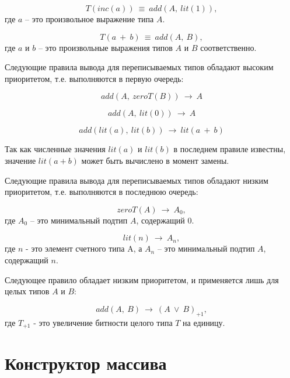 \documentclass[10pt,a4paper]{article}
\begin{document}
\begin{equation}
T(inc(a))~\equiv~add(A,~lit(1)),
\end{equation}
где $ a $ -- это произвольное выражение типа $ A $.

\begin{equation}
T(a~+~b)~\equiv~add(A,~B),
\end{equation}
где $ a $ и $ b $ -- это произвольные выражения типов $ A $ и $ B $ соответственно.

Следующие правила вывода для переписываемых типов обладают высоким приоритетом, т.е. выполняются в первую
очередь:

\begin{equation}
add(A,~zeroT(B))~\rightarrow~A
\end{equation}

\begin{equation}
add(A,~lit(0))~\rightarrow~A
\end{equation}

\begin{equation}
add(lit(a),~lit(b))~\rightarrow~lit(a~+~b)
\end{equation}

Так как численные значения $ lit(a) $ и $ lit(b) $ в последнем правиле известны, значение $ lit(a + b) $ может
быть вычислено в момент замены.

Следующие правила вывода для переписываемых типов обладают низким приоритетом, т.е. выполняются в последнюю
очередь:

\begin{equation}
zeroT(A)~\rightarrow~A_0,
\end{equation}
где $ A_0 $ -- это минимальный подтип $ A $, содержащий $ 0 $.

\begin{equation}
lit(n)~\rightarrow~A_n,
\end{equation}
где $ n $ - это элемент счетного типа A, а $ A_n $ -- это минимальный подтип $ A $, содержащий $ n $.

Следующее правило обладает низким приоритетом, и применяется лишь для целых типов $ A $ и $ B $:

\begin{equation}
add(A,~B)~\rightarrow~(A~\lor~B)_{+1},
\end{equation}
где $ T_{+1} $ - это увеличение битности целого типа $ T $ на единицу.

\section{Конструктор массива}
\end{document}
